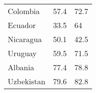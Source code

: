 \documentclass[]{book}
\begin{document}
\begin{longtable}[]{@{}lll@{}}
\begin{minipage}[t]{0.29\columnwidth}
Colombia\strut
\end{minipage} & \begin{minipage}[t]{0.10\columnwidth}\raggedright
57.4\strut
\end{minipage} & \begin{minipage}[t]{0.29\columnwidth}\raggedright
72.7\strut
\end{minipage}\tabularnewline
\begin{minipage}[t]{0.29\columnwidth}\raggedright
Ecuador\strut
\end{minipage} & \begin{minipage}[t]{0.10\columnwidth}\raggedright
33.5\strut
\end{minipage} & \begin{minipage}[t]{0.29\columnwidth}\raggedright
64\strut
\end{minipage}\tabularnewline
\begin{minipage}[t]{0.29\columnwidth}\raggedright
Nicaragua\strut
\end{minipage} & \begin{minipage}[t]{0.10\columnwidth}\raggedright
50.1\strut
\end{minipage} & \begin{minipage}[t]{0.29\columnwidth}\raggedright
42.5\strut
\end{minipage}\tabularnewline
\begin{minipage}[t]{0.29\columnwidth}\raggedright
Uruguay\strut
\end{minipage} & \begin{minipage}[t]{0.10\columnwidth}\raggedright
59.5\strut
\end{minipage} & \begin{minipage}[t]{0.29\columnwidth}\raggedright
71.5\strut
\end{minipage}\tabularnewline
\begin{minipage}[t]{0.29\columnwidth}\raggedright
Albania\strut
\end{minipage} & \begin{minipage}[t]{0.10\columnwidth}\raggedright
77.4\strut
\end{minipage} & \begin{minipage}[t]{0.29\columnwidth}\raggedright
78.8\strut
\end{minipage}\tabularnewline
\begin{minipage}[t]{0.29\columnwidth}\raggedright
Uzbekistan\strut
\end{minipage} & \begin{minipage}[t]{0.10\columnwidth}\raggedright
79.6\strut
\end{minipage} & \begin{minipage}[t]{0.29\columnwidth}\raggedright
82.8\strut
\end{minipage}\tabularnewline
\bottomrule
\end{longtable}
\end{document}
